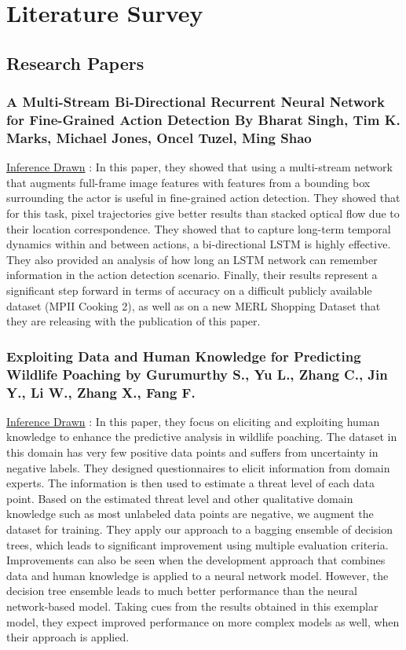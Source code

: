 \documentclass[12pt]{extarticle}
\begin{document}
\section{Literature Survey}

\subsection{Research Papers}

\subsubsection{A Multi-Stream Bi-Directional Recurrent Neural Network for Fine-Grained Action Detection By Bharat Singh, Tim K. Marks, Michael Jones, Oncel Tuzel, Ming Shao}

\underline{Inference Drawn} :
In this paper, they showed that using a multi-stream network that augments full-frame image features with features from a bounding box surrounding the actor is useful in fine-grained action detection. They showed that for this task, pixel trajectories give better results than stacked optical flow due to their location correspondence. They showed that to capture long-term temporal dynamics within and between actions, a bi-directional LSTM is highly effective. They also provided an analysis of how long an LSTM network can remember information in the action detection scenario. Finally, their results represent a significant step forward in terms of accuracy on a difficult publicly available dataset (MPII Cooking 2), as well as on a new MERL Shopping Dataset that they are releasing with the publication of this paper.

\subsubsection{Exploiting Data and Human Knowledge for Predicting Wildlife Poaching by Gurumurthy S., Yu L., Zhang C., Jin Y., Li W., Zhang X., Fang F.}	
\underline{Inference Drawn} :
In this paper, they focus on eliciting and exploiting human knowledge to enhance the predictive analysis in wildlife poaching. The dataset in this domain has very few positive data points and suffers from uncertainty in negative labels. They designed questionnaires to elicit information from domain experts. The information is then used to estimate a threat level of each data point. Based on the estimated threat level and other qualitative domain knowledge such as most unlabeled data points are negative, we augment the dataset for training. They apply our approach to a bagging ensemble of decision trees, which leads to significant improvement using multiple evaluation criteria. Improvements can also be seen when the development approach that combines data and human knowledge is applied to a neural network model. However, the decision tree ensemble leads to much better performance than the neural network-based model. Taking cues from the results obtained in this exemplar model, they expect improved performance on more complex models as well, when their approach is applied.
\end{document}
